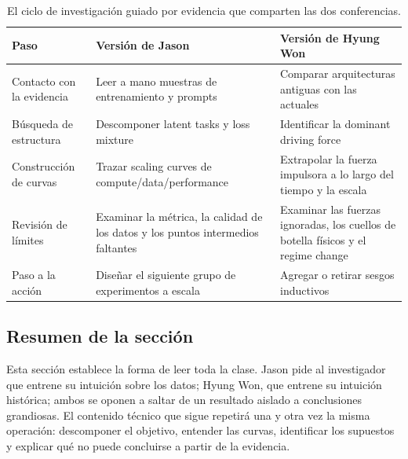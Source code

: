\begin{table}[H]
\centering
\begin{tabularx}{\textwidth}{L{0.19\textwidth} >{\raggedright\arraybackslash}X >{\raggedright\arraybackslash}X}
\toprule
Paso & Versión de Jason & Versión de Hyung Won \\
\midrule
Contacto con la evidencia & Leer a mano muestras de entrenamiento y prompts & Comparar arquitecturas antiguas con las actuales \\
Búsqueda de estructura & Descomponer latent tasks y loss mixture & Identificar la dominant driving force \\
Construcción de curvas & Trazar scaling curves de compute/data/performance & Extrapolar la fuerza impulsora a lo largo del tiempo y la escala \\
Revisión de límites & Examinar la métrica, la calidad de los datos y los puntos intermedios faltantes & Examinar las fuerzas ignoradas, los cuellos de botella físicos y el regime change \\
Paso a la acción & Diseñar el siguiente grupo de experimentos a escala & Agregar o retirar sesgos inductivos \\
\bottomrule
\end{tabularx}
\caption{El ciclo de investigación guiado por evidencia que comparten las dos conferencias.}
\end{table}

\subsection{Resumen de la sección}

Esta sección establece la forma de leer toda la clase. Jason pide al investigador que entrene su intuición sobre los datos; Hyung Won, que entrene su intuición histórica; ambos se oponen a saltar de un resultado aislado a conclusiones grandiosas. El contenido técnico que sigue repetirá una y otra vez la misma operación: descomponer el objetivo, entender las curvas, identificar los supuestos y explicar qué no puede concluirse a partir de la evidencia.
